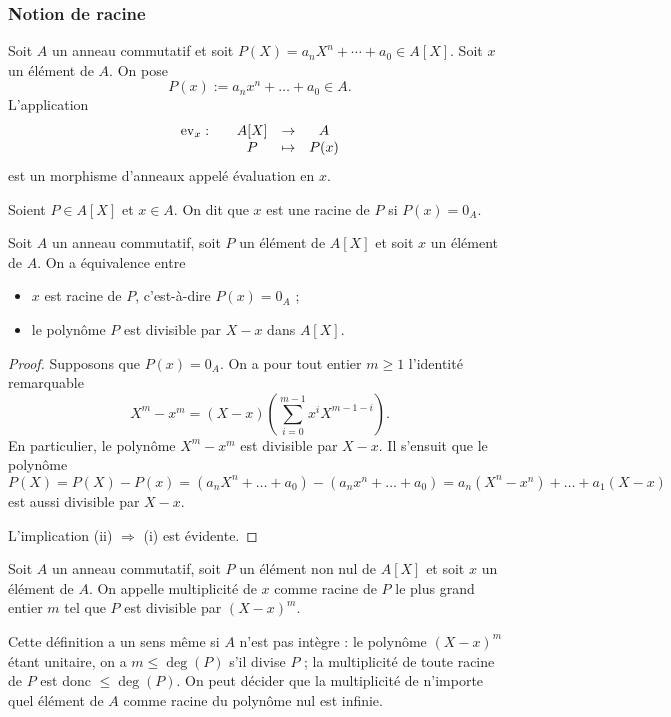 \documentclass[]{report}
\begin{document}
\subsubsection{Notion de racine}

Soit $A$ un anneau commutatif et soit $P(X) = a_n X^n + \cdots + a_0 \in A[X]$. Soit $x$ un élément de $A$. On pose
\[P(x) := a_n x^n + \dots + a_0 \in A.\]
L'application
\[\begin{array}{ccccc} \mathrm{ev}_x : & & A[X] & \to & A \\ & & P & \mapsto & P(x) \end{array}\]
est un morphisme d'anneaux appelé évaluation en $x$.

\begin{df}{}{}
    Soient $P \in A[X]$ et $x \in A$. On dit que $x$ est une racine de $P$ si $P(x) = 0_A$.
\end{df}

\begin{prop}{}{}
    Soit $A$ un anneau commutatif, soit $P$ un élément de $A[X]$ et soit $x$ un élément de $A$. On a équivalence entre
    \begin{itemize}
        \item[(i)] $x$ est racine de $P$, c'est-à-dire $P(x) = 0_A$ ;
        \item[(ii)] le polynôme $P$ est divisible par $X - x$ dans $A[X]$.
    \end{itemize}
\end{prop}

\begin{proof}
    Supposons que $P(x) = 0_A$. On a pour tout entier $m \ge 1$ l'identité remarquable
    \[X^m - x^m = (X - x)\left(\sum_{i = 0}^{m - 1} x^i X^{m - 1 - i}\right).\]
    En particulier, le polynôme $X^m - x^m$ est divisible par $X - x$. Il s'ensuit que le polynôme
    \[P(X) = P(X) - P(x) = \left(a_n X^n + \dots + a_0\right) - \left(a_n x^n + \dots + a_0\right) = a_n(X^n - x^n) + \dots + a_1(X - x)\]
    est aussi divisible par $X - x$.

    L'implication (ii) $\Rightarrow$ (i) est évidente.
\end{proof}

\begin{df}{}{}
    Soit $A$ un anneau commutatif, soit $P$ un élément non nul de $A[X]$ et soit $x$ un élément de $A$. On appelle multiplicité de $x$ comme racine de $P$ le plus grand entier $m$ tel que $P$ est divisible par $(X - x)^m$.

    Cette définition a un sens même si $A$ n'est pas intègre : le polynôme $(X - x)^m$ étant unitaire, on a $m \le \deg(P)$ s'il divise $P$ ; la multiplicité de toute racine de $P$ est donc $\le \deg(P)$. On peut décider que la multiplicité de n'importe quel élément de $A$ comme racine du polynôme nul est infinie.
\end{df}
\end{document}
